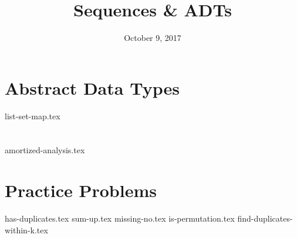 \documentclass[11pt]{exam}
\title{Sequences \& ADTs}
\date{October 9, 2017}
\begin{document}
\maketitle

\section{Abstract Data Types}
{list-set-map.tex}

\clearpage

\section{}
\begin{questions}
{amortized-analysis.tex}
\end{questions}

\clearpage

\section{Practice Problems}
\begin{questions}
{has-duplicates.tex}
{sum-up.tex}
\clearpage
{missing-no.tex}
{is-permutation.tex}
\clearpage
{find-duplicates-within-k.tex}
\end{questions}
\end{document}
